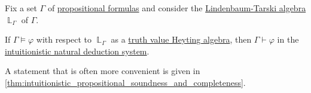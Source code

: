 \begin{theorem}\label{thm:intuitionistic_propositional_completeness}
  Fix a set \( \Gamma \) of \hyperref[def:propositional_syntax/formula]{propositional formulas} and consider the \hyperref[def:lindenbaum_tarski_algebra]{Lindenbaum-Tarski algebra} \( \BbbL_\Gamma \) of \( \Gamma \).

  If \( \Gamma \vDash \varphi \) with respect to \( \BbbL_\Gamma \) as a \hyperref[con:truth_value_algebra]{truth value Heyting algebra}, then \( \Gamma \vdash \varphi \) in the \hyperref[def:propositional_natural_deduction_systems]{intuitionistic natural deduction system}.
\end{theorem}
\begin{comments}
  \item A statement that is often more convenient is given in \cref{thm:intuitionistic_propositional_soundness_and_completeness}.
\end{comments}
